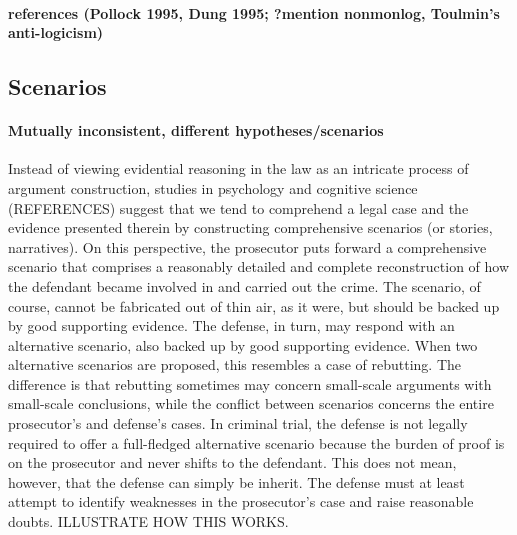 \documentclass[10pt]{article}
\begin{document}
  
 \paragraph{references (Pollock 1995, Dung 1995; ?mention nonmonlog, Toulmin's anti-logicism)}


\subsection{Scenarios}

\paragraph{Mutually inconsistent, different hypotheses/scenarios}

Instead of viewing evidential reasoning in the law as an intricate process of argument construction, 
studies in psychology and cognitive 
science (REFERENCES) suggest that we tend to comprehend a legal case and the evidence presented therein 
by constructing comprehensive scenarios (or stories, narratives). On this perspective, the prosecutor puts forward 
a comprehensive scenario that comprises a reasonably detailed and complete 
reconstruction of how the defendant became involved in and carried out the crime. The scenario, of course, 
cannot be fabricated out of thin air, as it were, but should be backed up by good supporting evidence. 
The defense, in turn, may respond with an alternative scenario, also backed up by good supporting evidence. 
When two alternative scenarios are proposed, this resembles a case of rebutting. The difference is that rebutting sometimes may concern 
small-scale arguments with small-scale conclusions, while the conflict between scenarios 
concerns the entire prosecutor's and defense's cases. 
In criminal trial, the defense is not legally required to offer a full-fledged alternative scenario because 
the burden of proof is on the prosecutor and never shifts to the defendant. This does not mean, however, 
that the defense can simply be inherit. 
The defense must at least attempt to identify weaknesses in the prosecutor's case 
and raise reasonable doubts. ILLUSTRATE HOW THIS WORKS. 
\end{document}
